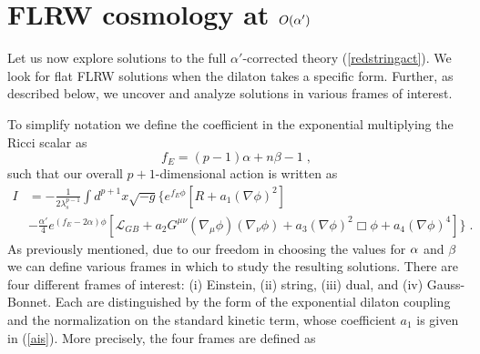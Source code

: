 \documentclass[amsmath,amssymb,11pt]{article}
\begin{document}
\section{FLRW cosmology at $O(\alpha')$} \label{sec:FRLWcosmo}

Let us now explore solutions to the full $\alpha'$-corrected theory (\ref{redstringact}). We look for flat FLRW solutions when the dilaton takes a specific form. Further, as described below, we uncover and analyze solutions in various frames of interest.


To simplify notation we define the coefficient in the exponential multiplying the Ricci scalar as
\begin{equation}
f_E = (p-1)\alpha+n\beta-1\;,
\end{equation}
such that our overall $p+1$-dimensional action is written as
\begin{equation}
\begin{split}
 I&=-\frac{1}{2\lambda^{p-1}_{s}}\int d^{p+1}x\sqrt{-g}\biggr\{e^{f_E \phi}\left[R+a_{1}(\nabla\phi)^{2}\right]\\
&-\frac{\alpha'}{4}e^{(f_E-2\alpha)\phi}\left[\mathcal{L}_{GB}+a_{2}G^{\mu\nu}(\nabla_{\mu}\phi)(\nabla_{\nu}\phi)+a_{3}(\nabla\phi)^{2}\Box\phi+a_{4}(\nabla\phi)^{4}\right]\biggr\}\;.
\end{split} 
\label{eq:usefulformofact}\end{equation}
As previously mentioned, due to our freedom in choosing the values for $\alpha$ and $\beta$ we can define various frames in which to study the resulting solutions. There are four different frames of interest: (i) Einstein, (ii) string, (iii) dual, and (iv) Gauss-Bonnet. Each are distinguished by the form of the exponential dilaton coupling and the normalization on the standard kinetic term, whose coefficient $a_1$ is given in (\ref{ais}). More precisely, the four frames are defined as
\end{document}
